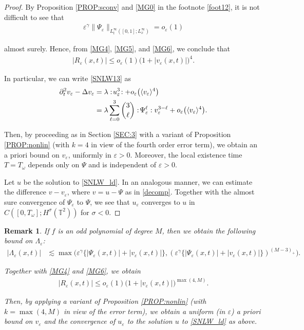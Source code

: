 \documentclass[letterpaper, 11pt,  reqno]{amsart}
\newtheorem{remark}[theorem]{Remark}
\newcommand{\1}{\hspace{0.5mm}\text{I}\hspace{0.5mm}}
\newcommand{\noi}{\noindent}
\newcommand{\T}{\mathbb{T}}
\newcommand{\Dl}{\Delta}
\newcommand{\eps}{\varepsilon}
\newcommand{\g}{\gamma}
\newcommand{\ld}{\lambda}
\newcommand{\Ld}{\Lambda}
\newcommand{\s}{\sigma}
\newcommand{\dt}{\partial_t}
\renewcommand{\l}{\ell}
\renewcommand{\o}{\omega}
\newcommand{\les}{\lesssim}
\newcommand{\jb}[1]
{\langle #1 \rangle}
\numberwithin{equation}{section}
\numberwithin{theorem}{section}
\begin{document}
\begin{proof}
By Proposition \ref{PROP:sconv} and \eqref{MG0} in the footnote \ref{foot12}, 
 it is not difficult to see that
\begin{align}
 \eps^{\gamma} \| \Psi_{\eps} \|_{L^{\infty}_t([0, 1]; L^\infty_x)} =
 o_{\eps} (1) 
\label{MG6}
\end{align}

\noi
almost surely.
Hence, from \eqref{MG4}, \eqref{MG5}, and \eqref{MG6}, 
we conclude that 
\begin{align*}
 | R_{\eps} (x, t ) | \leq o_{\eps} (1) \big(1 + |   v_{\eps} (x, t) |\big)^4 . 
\end{align*}



\noi
In particular, we can write \eqref{SNLW13} as 
\begin{align*}
 \dt^2 v_\eps - \Dl v_\eps 
 & = \ld  :\! u_\eps^3\!: 
+ o_\eps\big(\jb{ v_{\eps}}^4\big) \notag\\
& = 
\ld   \sum_{\l=0}^3 {3\choose \l} :\! \Psi_\eps^\l \,  \!: v_\eps^{3-\ell}
  + o_\eps\big(\jb{ v_{\eps}}^4\big).
 \end{align*}

\noi
Then, by proceeding  as in Section \ref{SEC:3}
with a variant of Proposition \ref{PROP:nonlin} 
(with $k = 4$ in view of the fourth order error term), 
 we obtain an a priori bound on $v_\eps$, uniformly in $\eps > 0$.
Moreover, the local existence time $T = T_\o $ 
depends only on $\Psi$
and is independent of $\eps>0$.

Let $u$ be the solution to \eqref{SNLW_ld}.
In an analogous manner, we can estimate the difference $v -v_\eps$, 
where $v = u - \Psi$ as in \eqref{decomp}.
Together with the almost sure convergence of $\Psi_\eps$ to $\Psi$, 
we see that $u_\eps$ converges to $u$ in $C([0, T_\o]; H^\s(\T^2))$
for $\s < 0$.
\end{proof}


\begin{remark}\label{REM:poly}\rm
If $f$ is an odd polynomial of degree $M$, then 
we obtain the following bound on $\Ld_\eps$:
\begin{align*} 
| \Ld_\eps (x, t) | 
& \les 
\max\Big(\eps^{\g} \big\{|    \Psi_{\eps} (x, t) | + | v_{\eps} (x, t) |\big\} , 
(\eps^{\g} \big\{|    \Psi_{\eps} (x, t) | + | v_{\eps} (x, t) |\big\})^{(M-3)_+}\Big).
\end{align*}

\noi
Together with \eqref{MG4} and \eqref{MG6}, we obtain 
\begin{align*} | R_{\eps} (x, t ) | \leq o_{\eps} (1) 
\big(1 + |  v_{\eps} (x, t) |\big)^{\max(4, M)}. 
\end{align*}

 \noi
 Then, by applying 
 a variant of Proposition \ref{PROP:nonlin} 
(with $k = \max(4, M)$ in view of the  error term), 
 we obtain a uniform (in $\eps$) a priori bound on $v_\eps$
 and the convergence of $u_\eps$ to the solution $u$
 to \eqref{SNLW_ld} as above.


\end{remark}
\end{document}
